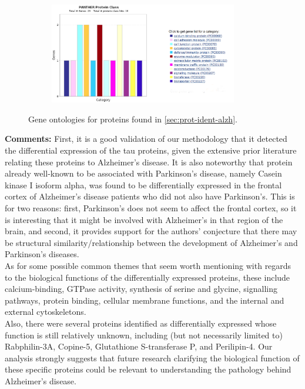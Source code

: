 \begin{figure}[H]
\begin{subfigure}[b]{0.5\linewidth}
\end{subfigure}
\begin{subfigure}[b]{0.5\linewidth}
\centering
\includegraphics[width=0.9\textwidth]{./Figures/GO/ad/ad4}\par
\end{subfigure}%
\begin{caption}
  {Gene ontologies for proteins found in \ref{sec:prot-ident-alzh}.}
\end{caption}
\end{figure}

\textbf{Comments:} First, it is a good validation of our methodology that it detected the differential expression of the tau proteins, given the extensive prior literature relating these proteins to Alzheimer's disease. It is also noteworthy that protein already well-known to be associated with Parkinson's disease, namely Casein kinase I isoform alpha, was found to be differentially expressed in the frontal cortex of Alzheimer's disease patients who did not also have Parkinson's. This is for two reasons: first, Parkinson's does not seem to affect the frontal cortex, so it is interesting that it might be involved with Alzheimer's in that region of the brain, and second, it provides support for the authors' conjecture that there may be structural similarity/relationship between the development of Alzheimer's and Parkinson's diseases.\\

As for some possible common themes that seem worth mentioning with regards to the biological functions of the differentially expressed proteins, these include calcium-binding, GTPase activity, synthesis of serine and glycine, signalling pathways, protein binding, cellular membrane functions, and the internal and external cytoskeletons.\\

Also, there were several proteins identified as differentially expressed whose function is still relatively unknown, including (but not necessarily limited to) Rabphilin-3A, Copine-5, Glutathione S-transferase P, and Perilipin-4. Our analysis strongly suggests that future research clarifying the biological function of these specific proteins could be relevant to understanding the pathology behind Alzheimer's disease.\\

